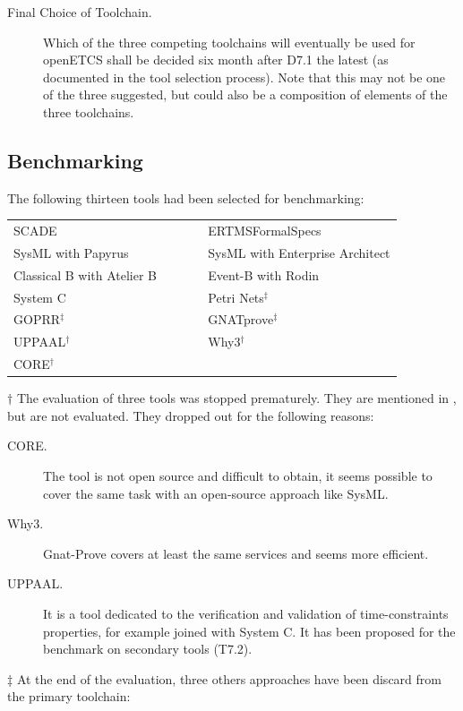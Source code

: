 \begin{description}
\item[Final Choice of Toolchain.] Which of the three competing toolchains will eventually be used for openETCS shall be decided six month after D7.1 the latest (as documented in the tool selection process).  Note that this may not be one of the three suggested, but could also be a composition of elements of the three toolchains.

\end{description}

\subsection{Benchmarking}
\label{sec:benchmarking}

The following thirteen tools had been selected for benchmarking:

\begin{tabular}{ p{0.5\linewidth} p{0.5\linewidth} }
SCADE & ERTMSFormalSpecs \\
SysML with Papyrus & SysML with Enterprise Architect \\
Classical B with Atelier B & Event-B with Rodin \\
System C & Petri Nets$^\ddagger$ \\
GOPRR$^\ddagger$ & GNATprove$^\ddagger$ \\
UPPAAL$^\dagger$ & Why3$^\dagger$ \\
CORE$^\dagger$
\end{tabular}

$\dagger$ The evaluation of three tools was stopped prematurely.  They are mentioned in \citep{WP7_O719}, but are not evaluated.  They dropped out for the following reasons:

\begin{description}
\item[CORE.] The tool is not open source and difficult to obtain, it seems possible to cover the same task with an open-source approach like SysML.
\item[Why3.] Gnat-Prove covers at least the same services and seems more efficient.
\item[UPPAAL.] It is a tool dedicated to the verification and validation of time-constraints properties, for example joined with System C. It has been proposed for the benchmark on secondary tools (T7.2).
\end{description}

$\ddagger$ At the end of the evaluation, three others approaches have been discard from the primary toolchain:

